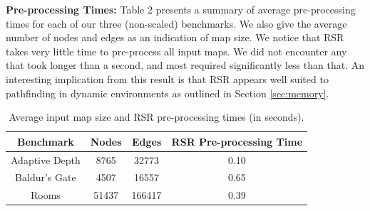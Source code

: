 \textbf{Pre-processing Times: } 
Table 2 presents a summary of average pre-processing times for
each of our three (non-scaled) benchmarks. We also give the average number of
nodes and edges as an indication of map size.
We notice that RSR takes very little time to pre-process all input maps. 
We did not encounter any that took longer than a second, and most required 
significantly less than that. 
An interesting implication from this result is that RSR appears well suited to
pathfinding in dynamic environments as outlined in Section \ref{sec:memory}.


\begin{table}
\label{table:preproc}
\begin{center}
\begin{tabular}{|c|c|c|c|}
\hline
\textbf{Benchmark} & \textbf{Nodes} & \textbf{Edges} & \textbf{RSR Pre-processing Time} \\ \hline
Adaptive Depth & 8765 &  32773 & 0.10 \\ \hline
Baldur's Gate & 4507 & 16557 & 0.65 \\ \hline
Rooms & 51437 & 166417 & 0.39 \\ \hline
\end{tabular}
\end{center}
\caption{Average input map size and RSR pre-processing times (in seconds). }
\end{table}

